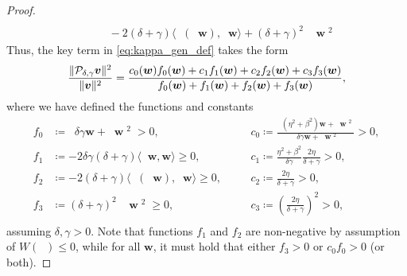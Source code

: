 \documentclass[review]{siamart}
\DeclareMathOperator{\cL}{\widehat{\mathcal{L}}}
\DeclareMathOperator{\cLs}{\widehat{\mathcal{L}}^2}
\DeclareMathOperator{\bVert}{\big\Vert}
\begin{document}
\begin{proof}
\begin{align}
	\\&\quad\quad	
	-2  (\delta + \gamma ) \langle \cL ( \cL \bm{w}), \cL \bm{w} \rangle 
	+  (\delta + \gamma)^2 \bVert \cL \bm{w} \bVert^2 
\end{align}
%
Thus, the key term in \eqref{eq:kappa_gen_def} takes the form
\begin{align}
\label{eq:P_gen_frac}
\frac{\Vert {\cal P}_{\delta,\gamma} \bm{v} \Vert^2}{\Vert \bm{v} \Vert^2}
=
\frac{
c_0(\bm{w}) f_0(\bm{w}) + c_1 f_1(\bm{w}) + c_2 f_2(\bm{w}) + c_3 f_3(\bm{w})
}
{
f_0(\bm{w}) + f_1(\bm{w}) + f_2(\bm{w}) + f_3(\bm{w})
},
\end{align}
where we have defined the functions and constants
\begin{equation}
\begin{aligned}
\label{eq:f_c_gen_def}
f_0 &\coloneqq \bVert \delta \gamma \bm{w} + \cLs \bm{w} \bVert^2 > 0,
\quad
&&c_0\coloneqq \frac{\bVert (\eta^2 + \beta^2) \bm{w} + \cLs \bm{w} \bVert^2}{\bVert \delta \gamma \bm{w} + \cLs \bm{w} \bVert^2} > 0,
\\
f_1 &\coloneqq -2 \delta \gamma (\delta + \gamma)  \langle \cL \bm{w}, \bm{w} \rangle \geq 0,
\quad 
&&c_1\coloneqq \frac{\eta^2 + \beta^2}{\delta \gamma} \frac{2 \eta}{\delta + \gamma} > 0,\\
f_2 &\coloneqq -2( \delta + \gamma) \langle \cL( \cL \bm{w}), \cL \bm{w} \rangle \geq 0, 
\quad
&&c_2\coloneqq \frac{2 \eta}{\delta + \gamma} > 0,\\
f_3 &\coloneqq (\delta+\gamma)^2 \bVert \cL \bm{w} \bVert^2 \geq 0, 
\quad
&&c_3\coloneqq \left(\frac{2 \eta}{\delta + \gamma}\right)^2 > 0, \\
\end{aligned}
\end{equation}
assuming $\delta, \gamma > 0$. Note that functions $f_1$ and $f_2$ are non-negative by
assumption of $W( \cL ) \leq 0$, while for all $\bm{w}$, it must hold that
either $f_3 > 0$ or $c_0f_0 > 0$ (or both).


\end{proof}
\end{document}
